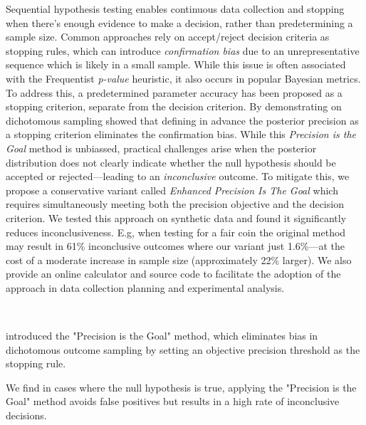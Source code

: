 Sequential hypothesis testing enables continuous data collection and stopping
when there's enough evidence to make a decision, rather than predetermining a sample
size.
Common approaches rely on accept/reject decision criteria as stopping rules,
which can introduce {\it confirmation bias} due to an unrepresentative sequence which is
likely in a small sample.
While this issue is often associated with the Frequentist {\it p-value} heuristic,
it also occurs in popular Bayesian metrics.
To address this, a predetermined parameter accuracy has been proposed
as a stopping criterion, separate from the decision criterion.
By demonstrating on dichotomous sampling \cite{kruschke2015doing} showed that defining in advance the
posterior precision as a stopping criterion eliminates the confirmation bias.
While this {\it Precision is the Goal} method is unbiassed,
practical challenges arise when the posterior distribution does not clearly indicate
whether the null hypothesis should be accepted or rejected—leading to an {\it inconclusive}
outcome.
To mitigate this, we propose a conservative variant called
{\it Enhanced Precision Is The Goal} which requires simultaneously meeting both the
precision objective and the decision criterion.
We tested this approach on synthetic data and found it significantly reduces
inconclusiveness. E.g, when testing for a fair coin the original method may result in 61\%
inconclusive outcomes where our variant just 1.6\%—at the cost of a moderate increase in sample
size (approximately 22\% larger).
We also provide an online calculator and source code to facilitate the adoption of the
approach in data collection planning and experimental analysis.


\
\

\cite{kruschke2015doing} introduced the "Precision is the Goal" method,
which eliminates bias in dichotomous outcome sampling by setting an objective precision threshold as the stopping rule.

We find in cases where the null hypothesis is true,
applying the "Precision is the Goal" method avoids false positives but results in a high rate of inconclusive decisions.


\
\


